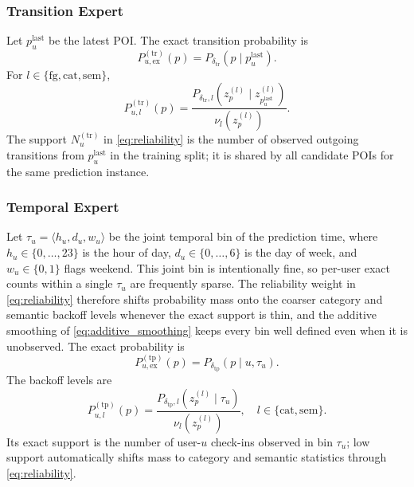 \documentclass[journal]{IEEEtran}
\begin{document}
\subsubsection{Transition Expert}

Let $p_u^{\mathrm{last}}$ be the latest POI.
The exact transition probability is
\begin{equation}
P_{u,\mathrm{ex}}^{(\mathrm{tr})}(p)
=
P_{\delta_{\mathrm{tr}}}(p\mid p_u^{\mathrm{last}}).
\label{eq:transition_exact}
\end{equation}
For $l\in\{\mathrm{fg},\mathrm{cat},\mathrm{sem}\}$,
\begin{equation}
P_{u,l}^{(\mathrm{tr})}(p)
=
\frac{
P_{\delta_{\mathrm{tr}},l}
(z_p^{(l)}\mid z_{p_u^{\mathrm{last}}}^{(l)})
}{
\nu_l(z_p^{(l)})
}.
\label{eq:transition_backoff}
\end{equation}
The support $N_u^{(\mathrm{tr})}$ in \eqref{eq:reliability} is the number of
observed outgoing transitions from $p_u^{\mathrm{last}}$ in the training
split; it is shared by all candidate POIs for the same prediction instance.

\subsubsection{Temporal Expert}

Let $\tau_u=\langle h_u,d_u,w_u\rangle$ be the joint temporal bin of the
prediction time, where $h_u\in\{0,\ldots,23\}$ is the hour of day,
$d_u\in\{0,\ldots,6\}$ is the day of week, and $w_u\in\{0,1\}$ flags weekend.
This joint bin is intentionally fine, so per-user exact counts within a single
$\tau_u$ are frequently sparse. The reliability weight in
\eqref{eq:reliability} therefore shifts probability mass onto the coarser
category and semantic backoff levels whenever the exact support is thin, and
the additive smoothing of \eqref{eq:additive_smoothing} keeps every bin
well defined even when it is unobserved.
The exact probability is
\begin{equation}
P_{u,\mathrm{ex}}^{(\mathrm{tp})}(p)
=
P_{\delta_{\mathrm{tp}}}(p\mid u,\tau_u).
\label{eq:temporal_exact}
\end{equation}
The backoff levels are
\begin{equation}
P_{u,l}^{(\mathrm{tp})}(p)
=
\frac{P_{\delta_{\mathrm{tp}},l}(z_p^{(l)}\mid\tau_u)}
{\nu_l(z_p^{(l)})},
\quad
l\in\{\mathrm{cat},\mathrm{sem}\}.
\label{eq:temporal_backoff}
\end{equation}
Its exact support is the number of user-$u$ check-ins observed in bin
$\tau_u$; low support automatically shifts mass to category and semantic
statistics through \eqref{eq:reliability}.
\end{document}
